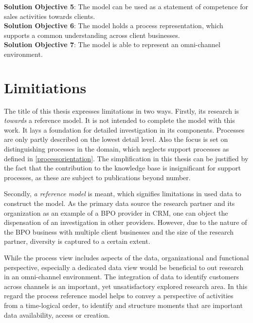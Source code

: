 \hfill\begin{minipage}{\dimexpr\textwidth-1.2cm}
	\textbf{Solution Objective 5}: The model can be used as a statement of competence for sales activities towards clients.
	\\
	
	\textbf{Solution Objective 6}: The model holds a process representation, which supports a common understanding across client businesses. 
	\\
	
	\textbf{Solution Objective 7}: The model is able to represent an omni-channel environment. 

\end{minipage}


\section{Limitiations}

The title of this thesis expresses limitations in two ways. Firstly, its research is \textit{towards} a reference model. It is not intended to complete the model with this work. It lays a foundation for detailed investigation in its components. Processes are only partly described on the lowest detail level. Also the focus is set on distinguishing processes in the domain, which neglects support processes as defined in \ref{processorientation}. The simplification in this thesis can be justified by the fact that the contribution to the knowledge base is insignificant for support processes, as these are subject to publications beyond number. 

Secondly, \textit{a reference model} is meant, which signifies limitations in used data to construct the model. As the primary data source the research partner and its organization as an example of a BPO provider in CRM, one can object the dispensation of an investigation in other providers. However, due to the nature of the BPO business with multiple client businesses and the size of the research partner, diversity is captured to a certain extent. 

While the process view includes aspects of the data, organizational and functional perspective, especially a dedicated data view would be beneficial to out research in an omni-channel environment. The integration of data to identify customers across channels is an important, yet unsatisfactory explored research area. In this regard the process reference model helps to convey a perspective of activities from a time-logical order, to identify and structure moments that are important \wrt data availability, access or creation. 

